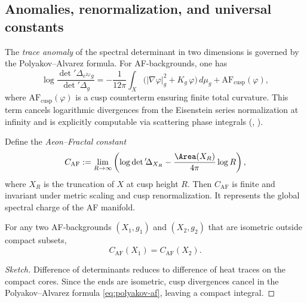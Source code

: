 \subsection{Anomalies, renormalization, and universal constants}
\label{subsec:af-anomaly}
\relax\hspace{0pt}

The \emph{trace anomaly} of the spectral determinant in two dimensions is
governed by the Polyakov–Alvarez formula. For AF-backgrounds, one has
\begin{equation}\label{eq:polyakov-af}
\log\frac{\det{}'\!\Delta_{e^{2\varphi}g}}
{\det{}'\!\Delta_{g}}
=-\frac{1}{12\pi}
\int_X\big(|\nabla\varphi|_g^2 + K_g\,\varphi\big)\,d\mu_g
+ \mathrm{AF}_{\mathrm{cusp}}(\varphi),
\end{equation}
where $\mathrm{AF}_{\mathrm{cusp}}(\varphi)$ is a cusp counterterm
ensuring finite total curvature. This term cancels logarithmic
divergences from the Eisenstein series normalization at infinity and is
explicitly computable via scattering phase integrals
(\cite{Borthwick}, \cite{Osgood1988}).                                  %

\begin{definition}\label{def:CAF}
Define the \emph{Aeon–Fractal constant}
\[
C_{\mathrm{AF}}
:= \lim_{R\to\infty}
\left(\log\det{}'\!\Delta_{X_R} - \frac{\Area(X_R)}{4\pi}\log R\right),
\]
where $X_R$ is the truncation of $X$ at cusp height $R$. Then
$C_{\mathrm{AF}}$ is finite and invariant under metric scaling and cusp
renormalization. It represents the global spectral charge of the AF
manifold.                                                               %
\end{definition}

\begin{theorem}\label{thm:renorm}
For any two AF-backgrounds $(X_1,g_1)$ and $(X_2,g_2)$ that are
isometric outside compact subsets,
\[
C_{\mathrm{AF}}(X_1)=C_{\mathrm{AF}}(X_2).
\]
\end{theorem}

\begin{proof}[Sketch]
Difference of determinants reduces to difference of heat traces on the
compact cores. Since the ends are isometric, cusp divergences cancel in
the Polyakov–Alvarez formula \eqref{eq:polyakov-af}, leaving a compact
integral.                                                               %
\end{proof}

